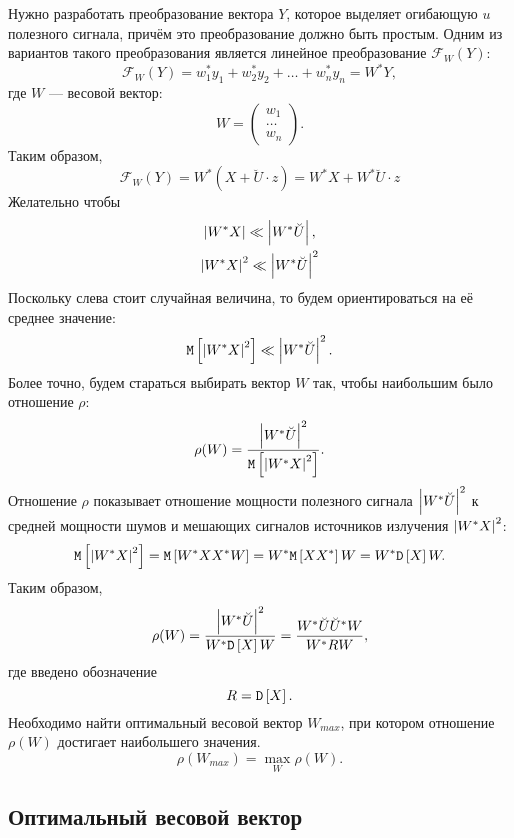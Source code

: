 Нужно разработать преобразование вектора $Y$, которое выделяет огибающую $u$ полезного сигнала, причём это преобразование должно быть простым. Одним из вариантов такого
преобразования является линейное преобразование $\mathcal{F}_W(Y)$:
\[
    \mathcal{F}_W(Y)
    = w_1^* y_1 + w_2^* y_2 + \dots + w_n^* y_n
    = W^* Y,
\]
где $W$ --- весовой вектор:
\[
    W =
    \begin{pmatrix}
        w_1   \\
        \dots \\
        w_n
    \end{pmatrix}.
\]
Таким образом,
\[
    \mathcal{F}_W(Y)
    = W^* \left ( X + \breve{U} \cdot z \right )
    = W^* X + W^* \breve{U} \cdot z
\]
Желательно чтобы
\begin{gather*}
    \left | W^* X \right | \ll \left | W^* \breve{U} \right | , \\
    \left | W^* X \right |^2 \ll \left | W^* \breve{U} \right |^2
\end{gather*}
Поскольку слева стоит случайная величина, то будем ориентироваться на её среднее значение:
\[
    \mathtt{M} \left [ \left | W^* X \right |^2 \right ] \ll \left | W^* \breve{U} \right |^2 .
\]
Более точно, будем стараться выбирать вектор $W$ так, чтобы наибольшим было отношение $\rho$:
\[
    \rho ( W ) = \frac{\left | W^* \breve{U} \right |^2}{\mathtt{M} \left [ \left | W^* X \right |^2 \right ]} .
\]
Отношение $\rho$ показывает отношение мощности полезного сигнала $\left | W^* \breve{U} \right |^2$ к средней мощности шумов и мешающих сигналов источников излучения $\left | W^* X \right |^2$:
\[
    \mathtt{M} \left [ \left | W^* X \right |^2 \right ]
    = \mathtt{M} \left [ W^* X X^* W \right ]
    = W^* \mathtt{M} \left [ X X^* \right ] W
    = W^* \mathtt{D} \left [ X \right ] W .
\]
Таким образом,
\[
    \rho ( W )
    = \frac{\left | W^* \breve{U} \right |^2}{W^* \mathtt{D} \left [ X \right ] W}
    = \frac{W^* \breve{U} \breve{U}^* W}{W^* R W} ,
\]
где введено обозначение
\[
    R = \mathtt{D} \left [ X \right ] .
\]
Необходимо найти оптимальный весовой вектор $W_{max}$, при котором отношение $\rho(W)$ достигает наибольшего значения.
\[
    \rho(W_{max}) = \max \limits_W \rho(W) .
\]

\subsection{Оптимальный весовой вектор}

